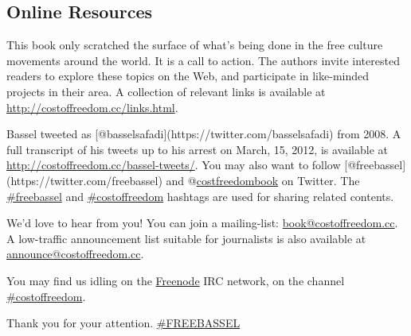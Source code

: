 \subsection{Online Resources}\label{online-resources}

This book only scratched the surface of what's being done in the free
culture movements around the world. It is a call to action. The authors
invite interested readers to explore these topics on the Web, and
participate in like-minded projects in their area. A collection of
relevant links is available at \url{http://costoffreedom.cc/links.html}.

Bassel tweeted as {[}@basselsafadi{]}(https://twitter.com/basselsafadi)
from 2008. A full transcript of his tweets up to his arrest on March,
15, 2012, is available at \url{http://costoffreedom.cc/bassel-tweets/}.
You may also want to follow
{[}@freebassel{]}(https://twitter.com/freebassel) and
@\href{https://twitter.com/costfreedombook}{costfreedombook} on Twitter.
The \href{https://twitter.com/hashtag/freebassel}{\#freebassel} and
\href{https://twitter.com/hashtag/costoffreedom}{\#costoffreedom}
hashtags are used for sharing related contents.

We'd love to hear from you! You can join a mailing-list:
\href{mailto:book-subscribe@costoffreedom.cc}{book@costoffreedom.cc}. A
low-traffic announcement list suitable for journalists is also available
at
\href{mailto:cof-announce-subscribe@lists.costoffreedom.cc}{announce@costoffreedom.cc}.

You may find us idling on the
\href{http://freenode.net/using_the_network.shtml}{Freenode} IRC
network, on the channel
\href{http://web.freenode.net/\#costoffreedom}{\#costoffreedom}.

Thank you for your attention.
\href{http://freebassel.org/}{\#FREEBASSEL}
